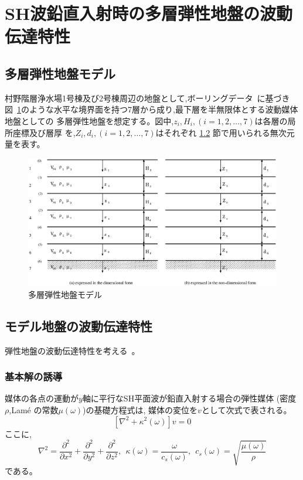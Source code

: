 \documentclass[titlepage]{jsarticle}
\def\dfrac#1#2{{\displaystyle\frac{#1}{#2}}}
\begin{document}
\section{SH波鉛直入射時の多層弾性地盤の波動伝達特性}\label{dentatsu}
\subsection{多層弾性地盤モデル}
村野階層浄水場1号棟及び2号棟周辺の地盤として,ボーリングデータ~\cite{2gou}に基づき
図~\ref{jiban}のような水平な境界面を持つ7層から成り,最下層を半無限体とする波動媒体地盤としての
多層弾性地盤を想定する。図中,$z_i,H_i,(i=1,2,\ldots ,7)$は各層の局所座標及び層厚
を,$Z_i,d_i,(i=1,2,\ldots ,7)$はそれぞれ \ref{yudou} 節で用いられる無次元量を表す。

\begin{figure}[htbp]
 \begin{center}
  \includegraphics[scale=0.7]{layered.eps}
  \caption{多層弾性地盤モデル}
  \label{jiban}
 \end{center}
\end{figure}

\subsection{モデル地盤の波動伝達特性}\label{yudou}
弾性地盤の波動伝達特性を考える~\cite{15B}。
\subsubsection{基本解の誘導}
媒体の各点の運動が$y$軸に平行なSH平面波が鉛直入射する場合の弾性媒体
(密度$\rho $,Lam\'e の常数$\mu (\omega )$)の基礎方程式は,
媒体の変位を$v$として次式で表される。
\begin{equation}
\left[ \nabla ^2 + \kappa ^2 (\omega ) \right] v = 0 \label{kisoeq}
\end{equation}
ここに,
\begin{equation}
\nabla ^2 = \dfrac{\partial ^2}{\partial x^2} + \dfrac{\partial ^2}{\partial y^2} +
	\dfrac{\partial ^2}{\partial z^2},~~ 
\kappa (\omega ) = \dfrac{\omega }{c_s(\omega )},~~
c_s(\omega ) = \sqrt{\dfrac{\mu (\omega )}{\rho}} \label{kappa}
\end{equation}
である。
\end{document}
